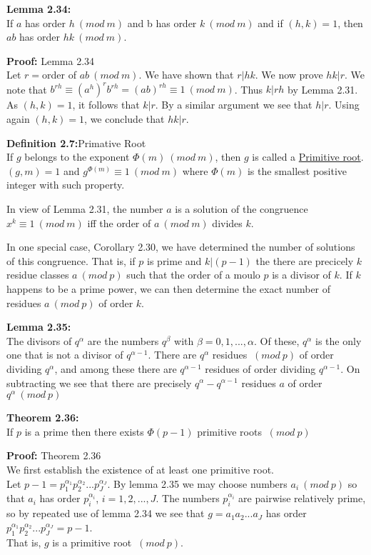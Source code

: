 \documentclass[a4paper]{article}
\begin{document}
\textbf{Lemma 2.34:}\\
If $a$ has order $h\ (mod\ m)$ and b has order $k\ (mod\ m)$ and if $(h,k)=1$, then $ab$ has order $hk\ (mod\ m)$.

\textbf{Proof:} Lemma 2.34\\
Let $r=$order of $ab \ (mod\ m)$. We have shown that $r|hk$. We now prove $hk|r$. We note that $b^{rh}\equiv (a^h)^rb^{rh}=(ab)^{rh}\equiv 1 \ (mod\ m)$. Thus $k|rh$ by Lemma 2.31. As $(h,k)=1$, it follows that $k|r$. By a similar argument we see that $h|r$. Using again $(h,k)=1$, we conclude that $hk|r$.

\textbf{Definition 2.7:}Primative Root\\
If $g$ belongs to the exponent $\Phi(m) \ (mod\ m)$, then $g$ is called a \underline{Primitive root}. $(g,m)=1$ and $g^{\Phi(m)}\equiv 1 \ (mod\ m)$ where $\Phi(m)$ is the smallest positive integer with such property.

In view of Lemma 2.31, the number $a$ is a solution of the congruence $x^k \equiv 1 \ (mod\ m)$ iff the order of $a \ (mod\ m)$ divides $k$.

In one special case, Corollary 2.30, we have determined the number of solutions of this congruence. That is, if $p$ is prime and $k|(p-1)$ the there are precicely $k$ residue classes $a \ (mod\ p)$ such that the order of a moulo $p$ is a divisor of $k$. If $k$ happens to be a prime power, we can then determine the exact number of residues $a \ (mod\ p)$ of order $k$.

\textbf{Lemma 2.35:}\\
The divisors of $q^\alpha$ are the numbers $q^\beta$ with $\beta = 0,1,...,\alpha$. Of these, $q^\alpha$ is the only one that is not a divisor of $q^{\alpha-1}$. There are $q^\alpha$ residues $\ (mod\ p)$ of order dividing $q^\alpha$, and among these there are $q^{\alpha-1}$ residues of order dividing $q^{\alpha-1}$. On subtracting we see that there are precisely $q^{\alpha}-q^{\alpha-1}$ residues $a$ of order $q^{\alpha} \ (mod\ p)$


\textbf{Theorem 2.36:}\\
If $p$ is a prime then there exists $\Phi(p-1)$ primitive roots $\ (mod\ p)$

\textbf{Proof:} Theorem 2.36\\
We first establish the existence of at least one primitive root.\\
Let $p-1=p_1^{\alpha_1}p_2^{\alpha_2}...p_J^{\alpha_J}$. By lemma 2.35 we may choose numbers $a_i \ (mod\ p)$ so that $a_i$ has order $p_i^{\alpha_i}$, $i=1,2,...,J$. The numbers $p_i^{\alpha_i}$ are pairwise relatively prime, so by repeated use of lemma 2.34 we see that $g=a_1a_2...a_J$ has order $p_1^{\alpha_1}p_2^{\alpha_2}...p_J^{\alpha_J}=p-1$.\\
That is, $g$ is a primitive root $\ (mod\ p)$.
\end{document}
